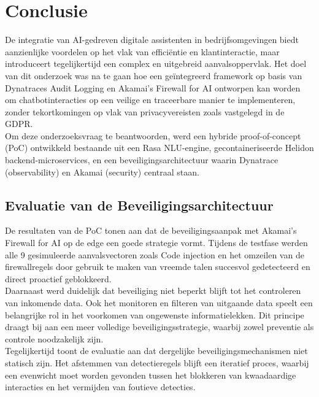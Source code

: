 
\chapter{Conclusie}%
\label{ch:conclusie}


De integratie van AI-gedreven digitale assistenten in bedrijfsomgevingen biedt aanzienlijke voordelen op het vlak van efficiëntie en klantinteractie, maar introduceert tegelijkertijd een complex en uitgebreid aanvalsoppervlak. Het doel van dit onderzoek was na te gaan hoe een geïntegreerd framework op basis van Dynatraces Audit Logging en Akamai’s Firewall for AI ontworpen kan worden om chatbotinteracties op een veilige en traceerbare manier te implementeren, zonder tekortkomingen op vlak van privacyvereisten zoals vastgelegd in de GDPR.\\

Om deze onderzoeksvraag te beantwoorden, werd een hybride proof-of-concept (PoC) ontwikkeld bestaande uit een Rasa NLU-engine, gecontaineriseerde Helidon backend-microservices, en een beveiligingsarchitectuur waarin Dynatrace (observability) en Akamai (security) centraal staan.

\section{Evaluatie van de Beveiligingsarchitectuur}

De resultaten van de PoC tonen aan dat de beveiligingsaanpak met Akamai’s Firewall for AI op de edge een goede strategie vormt. Tijdens de testfase werden alle 9 gesimuleerde aanvalsvectoren zoals Code injection en het omzeilen van de firewallregels door gebruik te maken van vreemde talen succesvol gedetecteerd en direct proactief geblokkeerd.\\

Daarnaast werd duidelijk dat beveiliging niet beperkt blijft tot het controleren van inkomende data. Ook het monitoren en filteren van uitgaande data speelt een belangrijke rol in het voorkomen van ongewenste informatielekken. Dit principe draagt bij aan een meer volledige beveiligingsstrategie, waarbij zowel preventie als controle noodzakelijk zijn.\\

Tegelijkertijd toont de evaluatie aan dat dergelijke beveiligingsmechanismen niet statisch zijn. Het afstemmen van detectieregels blijft een iteratief proces, waarbij een evenwicht moet worden gevonden tussen het blokkeren van kwaadaardige interacties en het vermijden van foutieve detecties.\\

